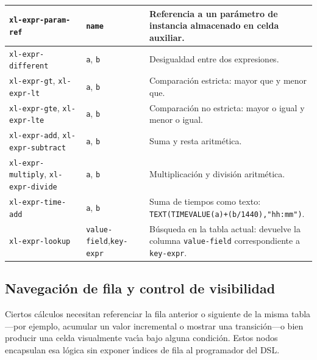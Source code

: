 \begin{table}[h!]
\begin{tabular}{p{4.2cm} p{3.8cm} p{5.8cm}}
\midrule
\texttt{xl-expr-param-ref}
  & \texttt{name}
  & Referencia a un par\'ametro de instancia almacenado en celda auxiliar. \\
\midrule
\texttt{xl-expr-different}
  & \texttt{a}, \texttt{b}
  & Desigualdad entre dos expresiones. \\
\midrule
\texttt{xl-expr-gt}, \texttt{xl-expr-lt}
  & \texttt{a}, \texttt{b}
  & Comparaci\'on estricta: mayor que y menor que. \\
\midrule
\texttt{xl-expr-gte}, \texttt{xl-expr-lte}
  & \texttt{a}, \texttt{b}
  & Comparaci\'on no estricta: mayor o igual y menor o igual. \\
\midrule
\texttt{xl-expr-add}, \texttt{xl-expr-subtract}
  & \texttt{a}, \texttt{b}
  & Suma y resta aritm\'etica. \\
\midrule
\texttt{xl-expr-multiply}, \texttt{xl-expr-divide}
  & \texttt{a}, \texttt{b}
  & Multiplicaci\'on y divisi\'on aritm\'etica. \\
\midrule
\texttt{xl-expr-time-add}
  & \texttt{a}, \texttt{b}
  & Suma de tiempos como texto:
    \texttt{TEXT(TIMEVALUE(a)+(b/1440),"hh:mm")}. \\
\midrule
\texttt{xl-expr-lookup}
  & \texttt{value-field},\newline\texttt{key-expr}
  & B\'usqueda en la tabla actual: devuelve la columna
    \texttt{value-field} correspondiente a \texttt{key-expr}. \\
\bottomrule
\end{tabular}
\end{table}

\subsection{Navegaci\'on de fila y control de visibilidad}
\label{sec:ast-navegacion-fila}

Ciertos c\'alculos necesitan referenciar la fila anterior o siguiente de la
misma tabla---por ejemplo, acumular un valor incremental o mostrar una
transici\'on---o bien producir una celda visualmente vac\'{\i}a bajo alguna
condici\'on.  Estos nodos encapsulan esa l\'ogica sin exponer \'{\i}ndices
de fila al programador del DSL.

